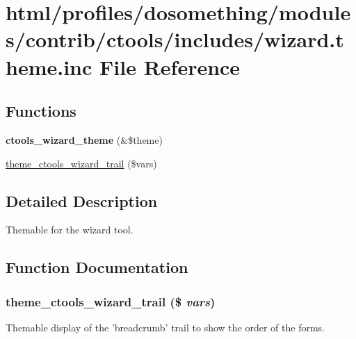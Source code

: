 \hypertarget{wizard_8theme_8inc}{
\section{html/profiles/dosomething/modules/contrib/ctools/includes/wizard.theme.inc File Reference}
\label{wizard_8theme_8inc}
}
\subsection*{Functions}
\begin{DoxyCompactItemize}
\item 
\hypertarget{wizard_8theme_8inc_a9430934de44781e1e37ce37027866fc5}{
{\bfseries ctools\_\-wizard\_\-theme} (\&\$theme)}
\label{wizard_8theme_8inc_a9430934de44781e1e37ce37027866fc5}

\item 
\hyperlink{wizard_8theme_8inc_a1de5c718bdb5da6ce3304922d2129f4a}{theme\_\-ctools\_\-wizard\_\-trail} (\$vars)
\end{DoxyCompactItemize}


\subsection{Detailed Description}
Themable for the wizard tool. 

\subsection{Function Documentation}
\hypertarget{wizard_8theme_8inc_a1de5c718bdb5da6ce3304922d2129f4a}{
\subsubsection[{theme\_\-ctools\_\-wizard\_\-trail}]{\setlength{\rightskip}{0pt plus 5cm}theme\_\-ctools\_\-wizard\_\-trail (\$ {\em vars})}}
\label{wizard_8theme_8inc_a1de5c718bdb5da6ce3304922d2129f4a}
Themable display of the 'breadcrumb' trail to show the order of the forms. 